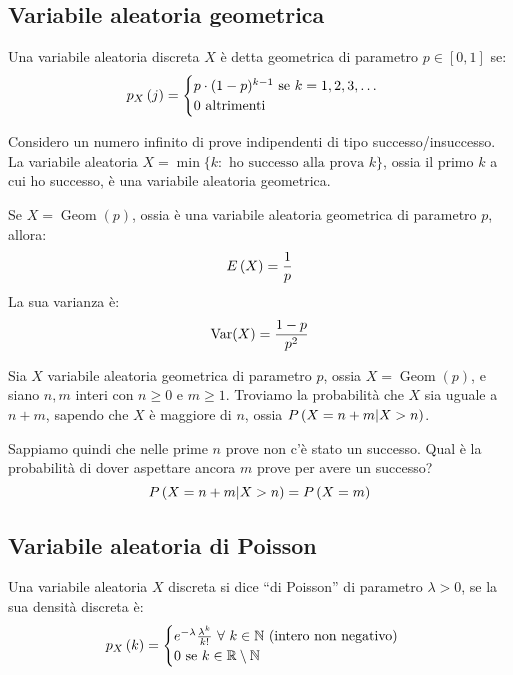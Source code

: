 \subsection{Variabile aleatoria geometrica}

\begin{defn}
Una variabile aleatoria discreta $X$ \`e detta geometrica di parametro $p \in [0,1]$ se:
\[
p_{X} \left( j \right) = 
\begin{cases}
p \cdot (1 - p)^{k-1} \text{ se } k = 1,2,3, \ldots \\
0 \text{ altrimenti}
\end{cases}
\]
\end{defn}
Considero un numero infinito di prove indipendenti di tipo successo/insuccesso. La variabile aleatoria $X = \min \{ k : \text{ ho successo alla prova } k \}$, ossia il primo $k$ a cui ho successo, \`e una variabile aleatoria geometrica.

\begin{theorem}
Se $X = \operatorname{Geom}(p)$, ossia \`e una variabile aleatoria geometrica di parametro $p$, allora:
\[
E \left( X \right) = \frac{1}{p}
\]
La sua varianza \`e:
\[
\operatorname{Var} (X) = \frac{1 - p}{p^2}
\]
\end{theorem}

\begin{theorem}
Sia $X$ variabile aleatoria geometrica di parametro $p$, ossia $X = \operatorname{Geom}(p)$, e siano $n, m$ interi con $n \ge 0$ e $m \ge 1$. Troviamo la probabilit\`a che $X$ sia uguale a $n + m$, sapendo che $X$ \`e maggiore di $n$, ossia $P \left( X = n + m | X > n \right)$.

Sappiamo quindi che nelle prime $n$ prove non c'\`e stato un successo. Qual \`e la probabilit\`a di dover aspettare ancora $m$ prove per avere un successo?
\[
P \left( X = n + m | X > n \right) = P \left( {X = m} \right)
\]
\end{theorem}

\subsection{Variabile aleatoria di Poisson}

\begin{defn}
Una variabile aleatoria $X$ discreta si dice ``di Poisson'' di parametro $\lambda > 0$, se la sua densit\`a discreta \`e:
\[
\mass{k} =
\begin{cases}
e^{- \lambda} \frac{\lambda^k}{k!} \forall k \in \naturals \text{ (intero non negativo)} \\
0 \text{ se } k \in \reals \setminus \naturals
\end{cases}
\]
\end{defn}

